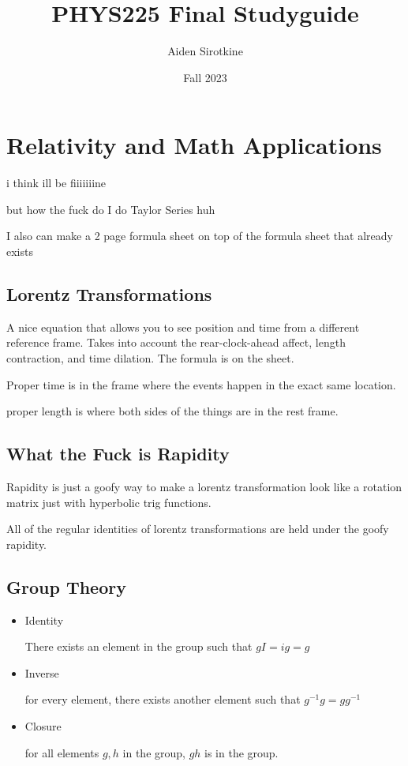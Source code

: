 \documentclass{report}
\date{Fall 2023}
\title{PHYS225 Final Studyguide}
\author{Aiden Sirotkine}
\begin{document}
\pagestyle{fancy}
\maketitle
\tableofcontents
\clearpage

\chapter{Relativity and Math Applications}

i think ill be fiiiiiiine

but how the fuck do I do Taylor Series huh

I also can make a 2 page formula sheet on top of the formula sheet that already exists

\section{Lorentz Transformations}
A nice equation that allows you to see position and time from a different reference frame. Takes into account the rear-clock-ahead affect, length contraction, and time dilation. The formula is on the sheet.

Proper time is in the frame where the events happen in the exact same location. 

proper length is where both sides of the things are in the rest frame.

\section{What the Fuck is Rapidity}
Rapidity is just a goofy way to make a lorentz transformation look like a rotation matrix just with hyperbolic trig functions. 

All of the regular identities of lorentz transformations are held under the goofy rapidity.

\section{Group Theory}
\begin{itemize}
\item
Identity

There exists an element in the group such that $gI = ig = g$

\item
Inverse

for every element, there exists another element such that $g^{-1}g = gg^{-1}$

\item
Closure

for all elements $g, h$ in the group, $gh$ is in the group.

\end{itemize}
\end{document}
